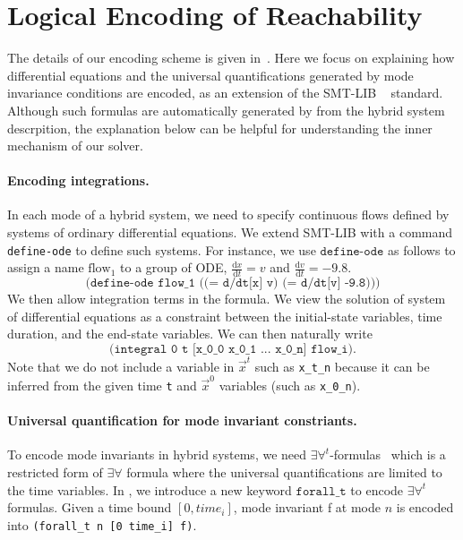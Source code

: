 \section{Logical Encoding of Reachability}


The details of our encoding scheme is given in~\cite{DBLP:journals/corr/GaoKCC14}. 
Here we focus on explaining how differential equations and the universal quantifications 
generated by mode invariance conditions are encoded, as an extension of the SMT-LIB
~\cite{BarST-SMT-10} standard. Although such formulas are automatically generated by \dReach{}
from the hybrid system descrpition, the explanation below can be helpful for 
understanding the inner mechanism of our solver. 

\paragraph{Encoding integrations.}
In each mode of a hybrid system, we need to specify continuous flows defined 
by systems of ordinary differential equations. We extend SMT-LIB with a command
\texttt{define-ode} to define such systems. For instance, we use $\texttt{define-ode}$ as follows to
assign a name $\mathrm{flow_1}$ to a group of ODE,
$\frac{\mathrm{d}x}{\mathrm{d}t} = v$ and
$\frac{\mathrm{d}v}{\mathrm{d}t} = -9.8$.
\[
\texttt{(define-ode flow\_1 ((= d/dt[x] v) (= d/dt[v] -9.8)))}
\]
We then allow integration terms in the formula. We view the solution of system of differential equations 
as a constraint between the initial-state variables, time duration, and the end-state variables. We can then naturally write
\[
\texttt{(integral 0 t [x\_0\_0 x\_0\_1 ... x\_0\_n] flow\_i)}.
\]
Note that we do not include a variable in $\vec{x}^t$ such as
\texttt{x\_t\_n} because it can be inferred from the given time
\texttt{t} and $\vec{x}^0$ variables (such as \texttt{x\_0\_n}).

\paragraph{Universal quantification for mode invariant constriants.} To encode mode invariants in hybrid systems, we
need $\exists\forall^t$-formulas~\cite{DBLP:conf/fmcad/GaoKC13} which
is a restricted form of $\exists\forall$ formula where the universal
quantifications are limited to the time variables. In \drh{}, we
introduce a new keyword $\texttt{forall\_t}$ to encode
$\exists\forall^t$ formulas. Given a time bound $[0, time_i]$, mode
invariant f at mode $n$ is encoded into \texttt{(forall\_t n [0
  time\_i] f)}.

